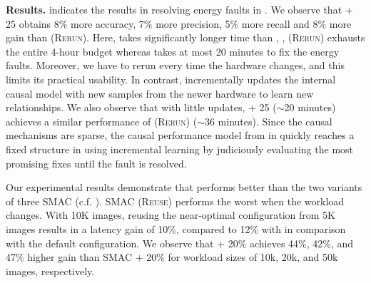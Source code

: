 \noindent \textbf{Results.} 
 indicates the results in resolving energy faults in \txtwo. We observe that \ourapproach + 25 obtains 8\% more accuracy, 7\% more precision, 5\% more recall and 8\% more gain than \bugdoc \textsc{(Rerun)}. Here, \bugdoc takes significantly longer time than \ourapproach, \ie, \bugdoc (\textsc{Rerun}) exhausts the entire 4-hour budget whereas \ourapproach takes at most 20 minutes to fix the energy faults. Moreover, we have to rerun \bugdoc every time the hardware changes, and this limits its practical usability. In contrast, \ourapproach incrementally updates the internal causal model with new samples from the newer hardware to learn new relationships. We also observe that with little updates, \ourapproach + 25 ($\sim$20 minutes) achieves a similar performance of \ourapproach \textsc{(Rerun)} ($\sim$36 minutes). Since the causal mechanisms are sparse, the causal performance model from \xavier in \ourapproach quickly reaches a fixed structure in \txtwo using incremental learning by judiciously evaluating the most promising fixes until the fault is resolved.

Our experimental results demonstrate that \ourapproach performs better than the two variants of three SMAC (c.f. ). SMAC (\textsc{Reuse}) performs the worst when the workload changes. With 10K images, reusing the near-optimal configuration from 5K images results in a latency gain of 10\%, compared to 12\% with \ourapproach in comparison with the default configuration. We observe that \ourapproach + 20\% achieves 44\%, 42\%, and 47\% higher gain than SMAC + 20\% for workload sizes of 10k, 20k, and 50k images, respectively. 




